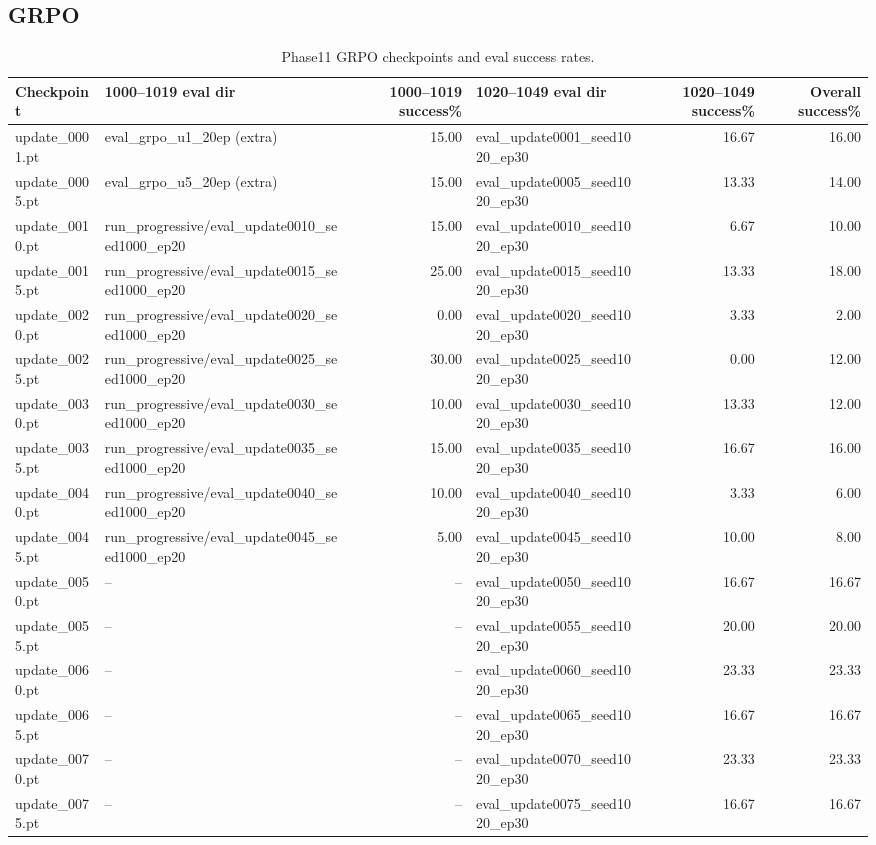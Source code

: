 \documentclass{article}
\begin{document}
\subsection{GRPO}
\begin{table}[t]
\centering
\begin{tabular}{l l r l r r}
\hline
Checkpoint & 1000--1019 eval dir & 1000--1019 success\% & 1020--1049 eval dir & 1020--1049 success\% & Overall success\% \\ 
\hline
update\_0001.pt & eval\_grpo\_u1\_20ep (extra) & 15.00 & eval\_update0001\_seed1020\_ep30 & 16.67 & 16.00 \\
update\_0005.pt & eval\_grpo\_u5\_20ep (extra) & 15.00 & eval\_update0005\_seed1020\_ep30 & 13.33 & 14.00 \\
update\_0010.pt & run\_progressive/eval\_update0010\_seed1000\_ep20 & 15.00 & eval\_update0010\_seed1020\_ep30 & 6.67 & 10.00 \\
update\_0015.pt & run\_progressive/eval\_update0015\_seed1000\_ep20 & 25.00 & eval\_update0015\_seed1020\_ep30 & 13.33 & 18.00 \\
update\_0020.pt & run\_progressive/eval\_update0020\_seed1000\_ep20 & 0.00 & eval\_update0020\_seed1020\_ep30 & 3.33 & 2.00 \\
update\_0025.pt & run\_progressive/eval\_update0025\_seed1000\_ep20 & 30.00 & eval\_update0025\_seed1020\_ep30 & 0.00 & 12.00 \\
update\_0030.pt & run\_progressive/eval\_update0030\_seed1000\_ep20 & 10.00 & eval\_update0030\_seed1020\_ep30 & 13.33 & 12.00 \\
update\_0035.pt & run\_progressive/eval\_update0035\_seed1000\_ep20 & 15.00 & eval\_update0035\_seed1020\_ep30 & 16.67 & 16.00 \\
update\_0040.pt & run\_progressive/eval\_update0040\_seed1000\_ep20 & 10.00 & eval\_update0040\_seed1020\_ep30 & 3.33 & 6.00 \\
update\_0045.pt & run\_progressive/eval\_update0045\_seed1000\_ep20 & 5.00 & eval\_update0045\_seed1020\_ep30 & 10.00 & 8.00 \\
update\_0050.pt & -- & -- & eval\_update0050\_seed1020\_ep30 & 16.67 & 16.67 \\
update\_0055.pt & -- & -- & eval\_update0055\_seed1020\_ep30 & 20.00 & 20.00 \\
update\_0060.pt & -- & -- & eval\_update0060\_seed1020\_ep30 & 23.33 & 23.33 \\
update\_0065.pt & -- & -- & eval\_update0065\_seed1020\_ep30 & 16.67 & 16.67 \\
update\_0070.pt & -- & -- & eval\_update0070\_seed1020\_ep30 & 23.33 & 23.33 \\
update\_0075.pt & -- & -- & eval\_update0075\_seed1020\_ep30 & 16.67 & 16.67 \\
\hline
\end{tabular}
\caption{Phase11 GRPO checkpoints and eval success rates.}
\label{tab:phase11-eval-success}
\end{table}
\end{document}
